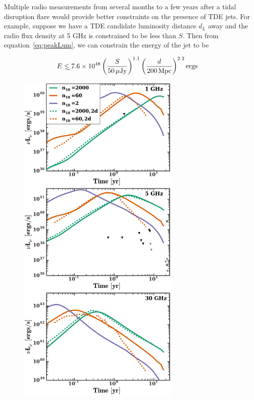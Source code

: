 \documentclass[usenatbib,fleqn]{mnras}
\newcommand\lsim{\mathrel{\rlap{\lower4pt\hbox{\hskip1pt$\sim$}}
    \raise1pt\hbox{$<$}}}
\begin{document}
Multiple radio measurements from several months to a few years after a
tidal disruption flare would provide better constraints on the
presence of TDE jets. For example, suppose we have a TDE candidate
luminosity distance $d_L$ away and the radio flux density at 5 GHz is
constrained to be less than $S$. Then from equation~\eqref{eq:peakLum},
we can constrain the energy of the jet to be

\begin{equation}
E\lsim 7.6 \times 10^{48} \left(\frac{S}{50 \,\mu{\rm Jy}}\right)^{1.1}
  \left(\frac{d}{200 \,{\rm Mpc}}\right)^{2.2} {\rm ergs}
\end{equation}


\begin{figure} 
  \includegraphics[width=8cm]{lightcurves.pdf}

\end{figure}
\end{document}
